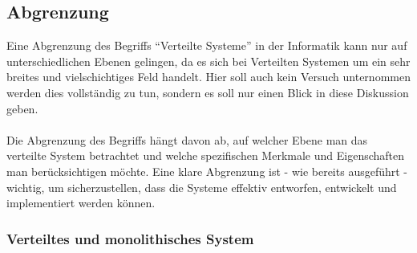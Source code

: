 \documentclass[../vs-script-first-v01.tex]{subfiles}
\begin{document}
\subsection{Abgrenzung}
Eine Abgrenzung des Begriffs \enquote{Verteilte Systeme} in der Informatik kann nur auf unterschiedlichen Ebenen gelingen, da es sich bei Verteilten Systemen um ein sehr breites und vielschichtiges Feld handelt. Hier soll auch kein Versuch unternommen werden dies vollständig zu tun, sondern es soll nur einen Blick in diese Diskussion geben.
\\\\
Die Abgrenzung des Begriffs hängt davon ab, auf welcher Ebene man das verteilte System betrachtet und welche spezifischen Merkmale und Eigenschaften man berücksichtigen möchte. Eine klare Abgrenzung ist - wie bereits ausgeführt - wichtig, um sicherzustellen, dass die Systeme effektiv entworfen, entwickelt und implementiert werden können.

\subsubsection{Verteiltes und monolithisches System}
\end{document}
